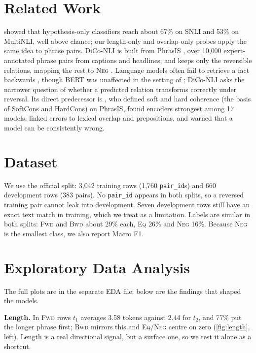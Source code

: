 \documentclass[11pt,a4paper]{article}
\newcommand{\EQ}{\textsc{Eq}}
\newcommand{\FWD}{\textsc{Fwd}}
\newcommand{\BWD}{\textsc{Bwd}}
\newcommand{\NEG}{\textsc{Neg}}
\begin{document}
\section{Related Work}
\label{sec:related}

\citet{gururangan2018annotation} showed that hypothesis-only classifiers reach about 67\% on SNLI and 53\% on MultiNLI, well above chance; our length-only and overlap-only probes apply the same idea to phrase pairs. DiCo-NLI is built from PhrasIS \citep{lopezgazpio2024phrasis}, over 10{,}000 expert-annotated phrase pairs from captions and headlines, and keeps only the reversible relations, mapping the rest to \NEG{} \citep{diconli2026}. Language models often fail to retrieve a fact backwards \citep[the Reversal Curse;][]{berglund2024reversal}, though BERT was unaffected in the setting of \citet{wu2024reversal}; DiCo-NLI asks the narrower question of whether a predicted relation transforms correctly under reversal. Its direct predecessor is \citet{apaolaza2026assessing}, who defined soft and hard coherence (the basis of SoftCons and HardCons) on PhrasIS, found encoders strongest among 17 models, linked errors to lexical overlap and prepositions, and warned that a model can be consistently wrong.

\section{Dataset}
\label{sec:dataset}

We use the official split: 3{,}042 training rows (1{,}760 \texttt{pair\_id}s) and 660 development rows (383 pairs). No \texttt{pair\_id} appears in both splits, so a reversed training pair cannot leak into development. Seven development rows still have an exact text match in training, which we treat as a limitation. Labels are similar in both splits: \FWD{} and \BWD{} about 29\% each, \EQ{} 26\% and \NEG{} 16\%. Because \NEG{} is the smallest class, we also report Macro F1.

\section{Exploratory Data Analysis}
\label{sec:eda}

The full plots are in the separate EDA file; below are the findings that shaped the models.

\textbf{Length.} In \FWD{} rows $t_1$ averages 3.58 tokens against 2.44 for $t_2$, and 77\% put the longer phrase first; \BWD{} mirrors this and \EQ/\NEG{} centre on zero (\cref{fig:length}, left). Length is a real directional signal, but a surface one, so we test it alone as a shortcut.
\end{document}
